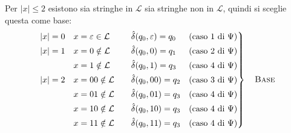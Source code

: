 \documentclass[a4paper, 11pt, oneside]{book}
\theoremstyle{formale}
\begin{document}
    Per $|x| \leq 2$ esistono sia stringhe in $\mathcal{L}$ sia stringhe non in
    $\mathcal{L}$, quindi si sceglie questa come base:
    \begin{equation*}
        \left.
        \begin{alignedat}{3}
            |x| = 0 \quad & x = \varepsilon \in \mathcal{L} & \qquad
                & \hat{\delta}(q_0, \varepsilon) = q_0
                &\quad \text{(caso 1 di $\Psi$)} \\
            |x| = 1 \quad & x = 0 \notin \mathcal{L} &
                & \hat{\delta}(q_0, 0) = q_1
                &\quad \text{(caso 2 di $\Psi$)} \\
            & x = 1 \notin \mathcal{L} &
                & \hat{\delta}(q_0, 1) = q_3
                &\quad \text{(caso 4 di $\Psi$)} \\
            |x| = 2 \quad & x = 00 \notin \mathcal{L} &
                & \hat{\delta}(q_0, 00) = q_2
                &\quad \text{(caso 3 di $\Psi$)} \\
            & x = 01 \notin \mathcal{L} &
                & \hat{\delta}(q_0, 01) = q_3
                &\quad \text{(caso 4 di $\Psi$)} \\
            & x = 10 \notin \mathcal{L} &
                & \hat{\delta}(q_0, 10) = q_3
                &\quad \text{(caso 4 di $\Psi$)} \\
            & x = 11 \notin \mathcal{L} &
                & \hat{\delta}(q_0, 11) = q_3
                &\quad \text{(caso 4 di $\Psi$)}
        \end{alignedat}
        \right\}
        \quad \text{\textsc{Base}}
    \end{equation*}
\end{document}
